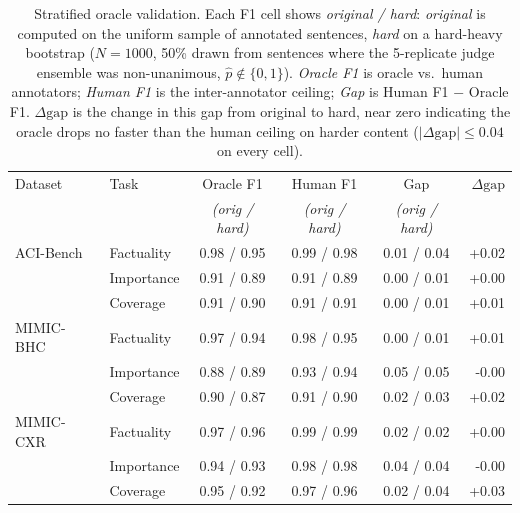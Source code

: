 \begin{table}[h]
\centering
\small
\caption{Stratified oracle validation. Each F1 cell shows \emph{original / hard}: \emph{original} is computed on the uniform sample of annotated sentences, \emph{hard} on a hard-heavy bootstrap ($N{=}1000$, 50\% drawn from sentences where the 5-replicate judge ensemble was non-unanimous, $\hat p \notin \{0, 1\}$). \emph{Oracle F1} is oracle vs.\ human annotators; \emph{Human F1} is the inter-annotator ceiling; \emph{Gap} is Human F1 $-$ Oracle F1. $\Delta\mathrm{gap}$ is the change in this gap from original to hard, near zero indicating the oracle drops no faster than the human ceiling on harder content ($|\Delta\mathrm{gap}|\!\le\!0.04$ on every cell).}
\label{tab:oracle-validation-stratified}
\begin{tabular}{ll ccc r}
\toprule
Dataset & Task & Oracle F1 & Human F1 & Gap & $\Delta\mathrm{gap}$ \\
 & & \emph{(orig / hard)} & \emph{(orig / hard)} & \emph{(orig / hard)} & \\
\midrule
  ACI-Bench & Factuality & 0.98 / 0.95 & 0.99 / 0.98 & 0.01 / 0.04 & +0.02 \\
   & Importance & 0.91 / 0.89 & 0.91 / 0.89 & 0.00 / 0.01 & +0.00 \\
   & Coverage & 0.91 / 0.90 & 0.91 / 0.91 & 0.00 / 0.01 & +0.01 \\
\midrule
  MIMIC-BHC & Factuality & 0.97 / 0.94 & 0.98 / 0.95 & 0.00 / 0.01 & +0.01 \\
   & Importance & 0.88 / 0.89 & 0.93 / 0.94 & 0.05 / 0.05 & -0.00 \\
   & Coverage & 0.90 / 0.87 & 0.91 / 0.90 & 0.02 / 0.03 & +0.02 \\
\midrule
  MIMIC-CXR & Factuality & 0.97 / 0.96 & 0.99 / 0.99 & 0.02 / 0.02 & +0.00 \\
   & Importance & 0.94 / 0.93 & 0.98 / 0.98 & 0.04 / 0.04 & -0.00 \\
   & Coverage & 0.95 / 0.92 & 0.97 / 0.96 & 0.02 / 0.04 & +0.03 \\
\bottomrule
\end{tabular}
\end{table}
